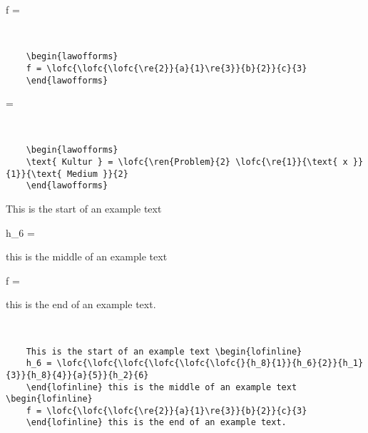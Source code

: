 \documentclass[12pt]{article}
\begin{document}
\begin{minipage}[c]{.45\textwidth}
	\begin{lawofforms}
		f = 
	\end{lawofforms}
\end{minipage}~~
\begin{minipage}[c]{.5\textwidth}
	\begin{lstlisting}
	\begin{lawofforms}
	f = \lofc{\lofc{\lofc{\re{2}}{a}{1}\re{3}}{b}{2}}{c}{3}
	\end{lawofforms}
	\end{lstlisting}
\end{minipage}


\begin{minipage}[c]{.45\textwidth}
	\begin{lawofforms}
		 = 
	\end{lawofforms}
\end{minipage}~~
\begin{minipage}[c]{.45\textwidth}
\begin{lstlisting}
	\begin{lawofforms}
	\text{ Kultur } = \lofc{\ren{Problem}{2} \lofc{\re{1}}{\text{ x }}{1}}{\text{ Medium }}{2}
	\end{lawofforms}
\end{lstlisting}
\end{minipage}


\begin{minipage}[c]{.45\textwidth}
	This is the start of an example text \begin{lofinline}
		h_6 = 
	\end{lofinline} this is the middle of an example text \begin{lofinline}
		f = 
	\end{lofinline} this is the end of an example text.
\end{minipage}~~
\begin{minipage}[c]{.45\textwidth}
\begin{lstlisting}
	This is the start of an example text \begin{lofinline}
	h_6 = \lofc{\lofc{\lofc{\lofc{\lofc{\lofc{}{h_8}{1}}{h_6}{2}}{h_1}{3}}{h_8}{4}}{a}{5}}{h_2}{6}
	\end{lofinline} this is the middle of an example text \begin{lofinline}
	f = \lofc{\lofc{\lofc{\re{2}}{a}{1}\re{3}}{b}{2}}{c}{3}
	\end{lofinline} this is the end of an example text.
\end{lstlisting}
\end{minipage}
\end{document}

